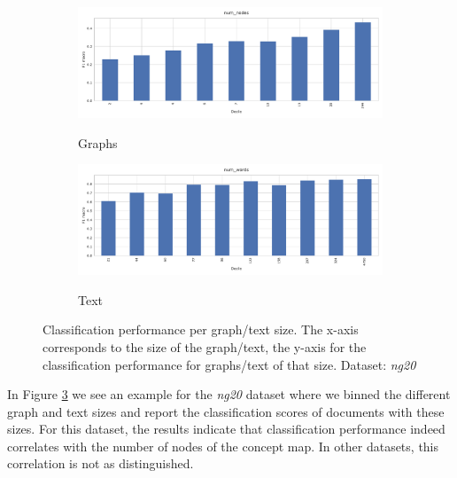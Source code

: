 \begin{figure}[htb!]
	\begin{subfigure}[t]{.5\linewidth}	{\includegraphics[width=\linewidth]{assets/figures/graph_binning_num_nodes.pdf}\label{fig:todo_1}}
	\caption{Graphs}
	\end{subfigure}
	\hfill
		\begin{subfigure}[t]{.5\linewidth}
	{\includegraphics[width=\linewidth]{assets/figures/text_binning_num_words.pdf}\label{fig:todo_2}}
	\caption{Text}
	\end{subfigure}
	\caption[Statistics: Histogram of classification performance per graph/text size]{Classification performance per graph/text size. The x-axis corresponds to the size of the graph/text, the y-axis for the classification performance for graphs/text of that size. Dataset: \textit{ng20}}\label{fig:graph_size_performance}
\end{figure}

In Figure \ref{fig:graph_size_performance} we see an example for the \textit{ng20} dataset where we binned the different graph and text sizes and report the classification scores of documents with these sizes.
For this dataset, the results indicate that classification performance indeed correlates with the number of nodes of the concept map.
In other datasets, this correlation is not as distinguished.




